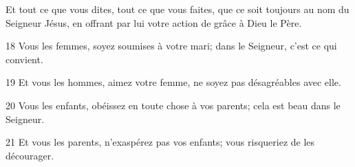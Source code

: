 Et tout ce que vous dites, tout ce que vous faites, que ce soit toujours au nom du Seigneur Jésus, en offrant par lui votre action de grâce à Dieu le Père.

18 Vous les femmes, soyez soumises à votre mari; dans le Seigneur, c’est ce qui convient.

19 Et vous les hommes, aimez votre femme, ne soyez pas désagréables avec elle.

20 Vous les enfants, obéissez en toute chose à vos parents; cela est beau dans le Seigneur.

21 Et vous les parents, n’exaspérez pas vos enfants; vous risqueriez de les décourager.